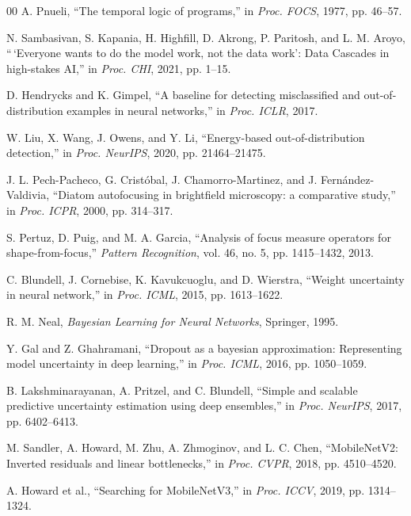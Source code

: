 \documentclass[conference]{IEEEtran}
\begin{document}
\begin{thebibliography}{00}
 A. Pnueli, ``The temporal logic of programs,'' in \emph{Proc. FOCS}, 1977, pp. 46--57.

 N. Sambasivan, S. Kapania, H. Highfill, D. Akrong, P. Paritosh, and L. M. Aroyo, ``\,`Everyone wants to do the model work, not the data work': Data Cascades in high-stakes AI,'' in \emph{Proc. CHI}, 2021, pp. 1--15.

 D. Hendrycks and K. Gimpel, ``A baseline for detecting misclassified and out-of-distribution examples in neural networks,'' in \emph{Proc. ICLR}, 2017.

 W. Liu, X. Wang, J. Owens, and Y. Li, ``Energy-based out-of-distribution detection,'' in \emph{Proc. NeurIPS}, 2020, pp. 21464--21475.

 J. L. Pech-Pacheco, G. Crist{\'o}bal, J. Chamorro-Martinez, and J. Fern{\'a}ndez-Valdivia, ``Diatom autofocusing in brightfield microscopy: a comparative study,'' in \emph{Proc. ICPR}, 2000, pp. 314--317.

 S. Pertuz, D. Puig, and M. A. Garcia, ``Analysis of focus measure operators for shape-from-focus,'' \emph{Pattern Recognition}, vol. 46, no. 5, pp. 1415--1432, 2013.

 C. Blundell, J. Cornebise, K. Kavukcuoglu, and D. Wierstra, ``Weight uncertainty in neural network,'' in \emph{Proc. ICML}, 2015, pp. 1613--1622.

 R. M. Neal, \emph{Bayesian Learning for Neural Networks}, Springer, 1995.

 Y. Gal and Z. Ghahramani, ``Dropout as a bayesian approximation: Representing model uncertainty in deep learning,'' in \emph{Proc. ICML}, 2016, pp. 1050--1059.

 B. Lakshminarayanan, A. Pritzel, and C. Blundell, ``Simple and scalable predictive uncertainty estimation using deep ensembles,'' in \emph{Proc. NeurIPS}, 2017, pp. 6402--6413.

 M. Sandler, A. Howard, M. Zhu, A. Zhmoginov, and L. C. Chen, ``MobileNetV2: Inverted residuals and linear bottlenecks,'' in \emph{Proc. CVPR}, 2018, pp. 4510--4520.

 A. Howard et al., ``Searching for MobileNetV3,'' in \emph{Proc. ICCV}, 2019, pp. 1314--1324.


\end{thebibliography}
\end{document}
